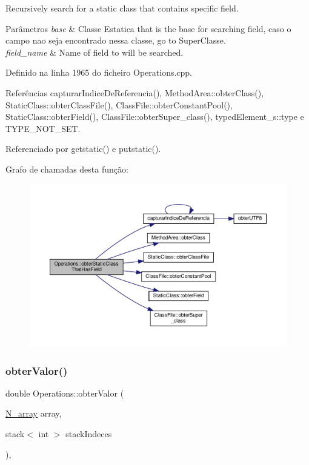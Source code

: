 Recursively search for a static class that contains specific field. 


\begin{DoxyParams}{Parâmetros}
{\em base} & Classe Estatica that is the base for searching field, caso o campo nao seja encontrado nessa classe, go to Super\+Classe. \\
\hline
{\em field\+\_\+name} & Name of field to will be searched. \\
\hline
\end{DoxyParams}


Definido na linha 1965 do ficheiro Operations.\+cpp.



Referências capturar\+Indice\+De\+Referencia(), Method\+Area\+::obter\+Class(), Static\+Class\+::obter\+Class\+File(), Class\+File\+::obter\+Constant\+Pool(), Static\+Class\+::obter\+Field(), Class\+File\+::obter\+Super\+\_\+class(), typed\+Element\+\_\+s\+::type e T\+Y\+P\+E\+\_\+\+N\+O\+T\+\_\+\+S\+ET.



Referenciado por getstatic() e putstatic().

Grafo de chamadas desta função\+:\nopagebreak
\begin{figure}[H]
\begin{center}
\leavevmode
\includegraphics[width=350pt]{classOperations_a2e9f822a1a6b9b0fb374eafb5a55f9f4_cgraph}
\end{center}
\end{figure}
\mbox{\label{classOperations_a926006a1873abe481d6877428355fdf2}} 
\subsubsection{\texorpdfstring{obter\+Valor()}{obterValor()}}
{\footnotesize\ttfamily double Operations\+::obter\+Valor (\begin{DoxyParamCaption}\item[{\hyperlink{structN__array}{N\+\_\+array}}]{array,  }\item[{stack$<$ int $>$}]{stack\+Indeces }\end{DoxyParamCaption})\hspace{0.3cm}{\ttfamily [static]}, {\ttfamily [private]}}



